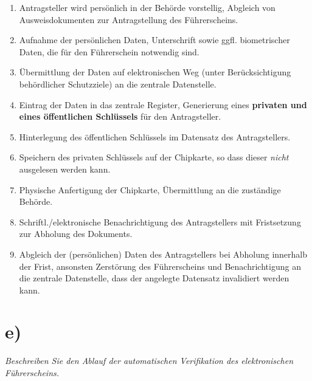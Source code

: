 \begin{enumerate}
    \itemsep0.5em
    \item Antragsteller wird persönlich in der Behörde vorstellig, Abgleich von Ausweisdokumenten zur Antragstellung des Führerscheins.
    \item Aufnahme der persönlichen Daten, Unterschrift sowie ggfl. biometrischer Daten, die für den Führerschein notwendig sind.
    \item Übermittlung der Daten auf elektronischen Weg (unter Berücksichtigung behördlicher Schutzziele) an die zentrale Datenstelle.
    \item Eintrag der Daten in das zentrale Register, Generierung eines \textbf{privaten und eines öffentlichen Schlüssels} für den Antragsteller.
    \item Hinterlegung des öffentlichen Schlüssels im Datensatz des Antragstellers.
    \item Speichern des privaten Schlüssels auf der Chipkarte, so dass dieser \textit{nicht} ausgelesen werden kann.
    \item Physische Anfertigung der Chipkarte, Übermittlung an die zuständige Behörde.
    \item Schriftl./elektronische Benachrichtigung des Antragstellers mit Fristsetzung zur Abholung des Dokuments.
    \item Abgleich der (persönlichen) Daten des Antragstellers bei Abholung innerhalb der Frist, ansonsten Zerstörung des Führerscheins und Benachrichtigung an die zentrale Datenstelle, dass der angelegte Datensatz invalidiert werden kann.
\end{enumerate}


\section{e)}

\textit{Beschreiben Sie den Ablauf der automatischen Verifikation des elektronischen
Führerscheins.}


